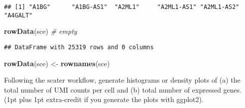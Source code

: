\documentclass[]{article}
\newenvironment{Shaded}{\begin{snugshade}}{\end{snugshade}}
\newcommand{\KeywordTok}[1]{\textcolor[rgb]{0.13,0.29,0.53}{\textbf{#1}}}
\newcommand{\StringTok}[1]{\textcolor[rgb]{0.31,0.60,0.02}{#1}}
\newcommand{\CommentTok}[1]{\textcolor[rgb]{0.56,0.35,0.01}{\textit{#1}}}
\newcommand{\NormalTok}[1]{#1}
\begin{document}
\begin{verbatim}
## [1] "A1BG"      "A1BG-AS1"  "A2ML1"     "A2ML1-AS1" "A2ML1-AS2" "A4GALT"
\end{verbatim}

\begin{Shaded}
\begin{Highlighting}[]
\KeywordTok{rowData}\NormalTok{(sce) }\CommentTok{# empty }
\end{Highlighting}
\end{Shaded}

\begin{verbatim}
## DataFrame with 25319 rows and 0 columns
\end{verbatim}

\begin{Shaded}
\begin{Highlighting}[]
\KeywordTok{rowData}\NormalTok{(sce) <-}\StringTok{ }\KeywordTok{rownames}\NormalTok{(sce)}
\end{Highlighting}
\end{Shaded}

Following the scater workflow, generate histograms or density plots of
(a) the total number of UMI counts per cell and (b) total number of
expressed genes. (1pt plus 1pt extra-credit if you generate the plots
with ggplot2).
\end{document}

